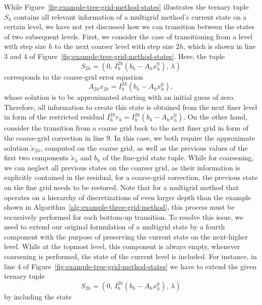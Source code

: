 While Figure~\ref{fig:example-tree-grid-method-states} illustrates the ternary tuple $S_h$ contains all relevant information of a multigrid method's current state on a certain level, we have not yet discussed how we can transition between the states of two subsequent levels.
First, we consider the case of transitioning from a level with step size $h$ to the next coarser level with step size $2h$, which is shown in line 3 and 4 of Figure~\ref{fig:example-tree-grid-method-states}.
Here, the tuple
\begin{equation*}
	S_{2h} = (0, \, I_{h}^{2h}(b_{h} - A_h x_{h}^0), \, \lambda)
\end{equation*} 
corresponds to the coarse-grid error equation 
\begin{equation*}
	A_{2h} x_{2h} = I_{h}^{2h}(b_{h} - A_h x_{h}^0),
\end{equation*}
whose solution is to be approximated starting with an initial guess of zero.
Therefore, all information to create this state is obtained from the next finer level in form of the restricted residual $I_h^{2h} r_h = I_h^{2h} (b_{h} - A_h x_{h}^0)$.
On the other hand, consider the transition from a coarse grid back to the next finer grid in form of the coarse-grid correction in line 9.
In this case, we both require the approximate solution $\tilde{x}_{2h}$, computed on the coarse grid, as well as the previous values of the first two components $\tilde{x}_h$ and $b_h$ of the fine-grid state tuple.
While for coarsening, we can neglect all previous states on the coarser grid, as their information is explicitly contained in the residual, for a coarse-grid correction, the previous state on the fine grid needs to be restored.
Note that for a multigrid method that operates on a hierarchy of discretizations of even larger depth than the example shown in Algorithm~\ref{alg:example-three-grid-method}, this process must be recursively performed for each bottom-up transition.
To resolve this issue, we need to extend our original formulation of a multigrid state by a fourth component with the purpose of preserving the current state on the next-higher level.
While at the topmost level, this component is always empty, whenever coarsening is performed, the state of the current level is included.
For instance, in line 4 of Figure~\ref{fig:example-tree-grid-method-states} we have to extend the given ternary tuple 
\begin{equation*}
S_{2h} = (0, \, I_{h}^{2h}(b_{h} - A_h x_{h}^0), \, \lambda)
\end{equation*}
by including the state 
